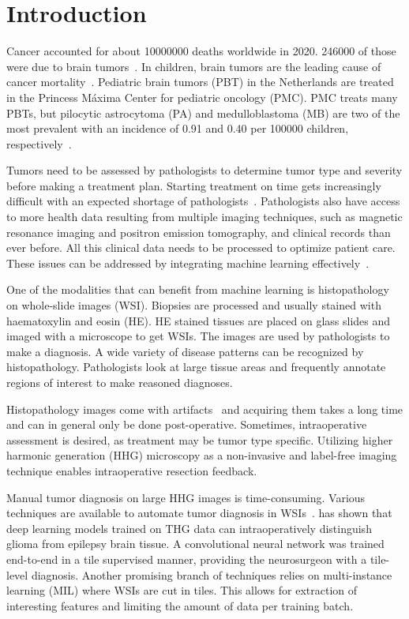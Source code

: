 \section{Introduction}

Cancer accounted for about \num{10000000} deaths worldwide in 2020.
\num{246000} of those were due to brain tumors~.
In children, brain tumors are the leading cause of cancer mortality~.
Pediatric brain tumors (PBT) in the Netherlands are treated in the Princess Máxima Center for pediatric oncology (PMC).
PMC treats many PBTs, but pilocytic astrocytoma (PA) and medulloblastoma (MB) are two of the most prevalent with an incidence of 0.91 and 0.40 per 100000 children, respectively~.

Tumors need to be assessed by pathologists to determine tumor type and severity before making a treatment plan.
Starting treatment on time gets increasingly difficult with an expected shortage of pathologists~.
Pathologists also have access to more health data resulting from multiple imaging techniques, such as magnetic resonance imaging and positron emission tomography, and clinical records than ever before.
All this clinical data needs to be processed to optimize patient care.
These issues can be addressed by integrating machine learning effectively~.

One of the modalities that can benefit from machine learning is histopathology on whole-slide images (WSI).
Biopsies are processed and usually stained with haematoxylin and eosin (HE).
HE stained tissues are placed on glass slides and imaged with a microscope to get WSIs.
The images are used by pathologists to make a diagnosis.
A wide variety of disease patterns can be recognized by histopathology.
Pathologists look at large tissue areas and frequently annotate regions of interest to make reasoned diagnoses.

Histopathology images come with artifacts~ and acquiring them takes a long time and can in general only be done post-operative.
Sometimes, intraoperative assessment is desired, as treatment may be tumor type specific.
Utilizing higher harmonic generation (HHG) microscopy as a non-invasive and label-free imaging technique enables intraoperative resection feedback.

Manual tumor diagnosis on large HHG images is time-consuming.
Various techniques are available to automate tumor diagnosis in WSIs~.
\textcite{Blokker2022} has shown that deep learning models trained on THG data can intraoperatively distinguish glioma from epilepsy brain tissue.
A convolutional neural network was trained end-to-end in a tile supervised manner, providing the neurosurgeon with a tile-level diagnosis.
Another promising branch of techniques relies on multi-instance learning (MIL) where WSIs are cut in tiles.
This allows for extraction of interesting features and limiting the amount of data per training batch.

